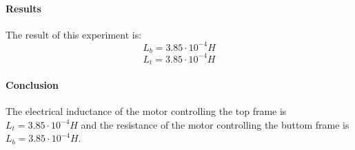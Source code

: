 \documentclass[../../main]{subfiles}
\begin{document}
\paragraph{Results}

The result of this experiment is:
$$L_b = 3.85 \cdot 10^{-4}H$$
$$L_t = 3.85 \cdot 10^{-4}H$$

\paragraph{Conclusion}

The electrical inductance of the motor controlling the top frame is $L_t= 3.85 \cdot 10^{-4}H$ and the resistance of the motor controlling the buttom frame is $L_b= 3.85 \cdot 10^{-4}H$.
\end{document}
